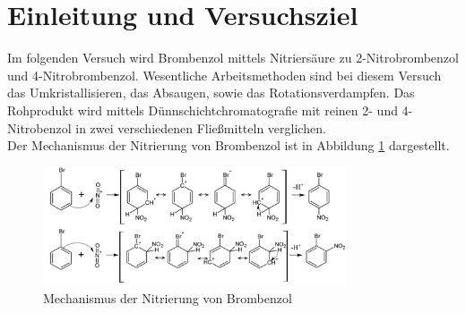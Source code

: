 \section{Einleitung und Versuchsziel}
\label{sec:aufgabenstellung}

Im folgenden Versuch wird Brombenzol mittels Nitriersäure zu 2-Nitrobrombenzol und 4-Nitrobrombenzol. Wesentliche Arbeitsmethoden sind bei diesem Versuch das Umkristallisieren, das Absaugen, sowie das Rotationsverdampfen. Das Rohprodukt wird mittels Dünnschichtchromatografie mit reinen 2- und 4-Nitrobenzol in zwei verschiedenen Fließmitteln verglichen.\\
Der Mechanismus der Nitrierung von Brombenzol ist in Abbildung \ref{fig:mechanismus} dargestellt.

\begin{figure}[h!]
	\centering
	\includegraphics[width=0.8\textwidth]{img/mechanismus}
	\caption{Mechanismus der Nitrierung von Brombenzol}
	\label{fig:mechanismus}
\end{figure}
\FloatBarrier




